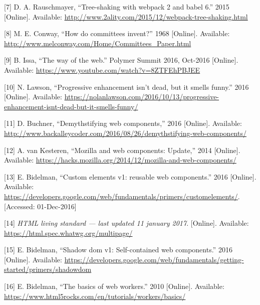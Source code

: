 \documentclass[]{assets/latex/ieee}
\begin{document}
\hypertarget{ref-Rauschmayer2015}{}
{[}7{]} D. A. Rauschmayer, ``Tree-shaking with webpack 2 and babel 6.''
2015 {[}Online{]}. Available:
\url{http://www.2ality.com/2015/12/webpack-tree-shaking.html}

\hypertarget{ref-Conway1968}{}
{[}8{]} M. E. Conway, ``How do committees invent?'' 1968 {[}Online{]}.
Available: \url{http://www.melconway.com/Home/Committees_Paper.html}

\hypertarget{ref-Issa2016}{}
{[}9{]} B. Issa, ``The way of the web.'' Polymer Summit 2016, Oct-2016
{[}Online{]}. Available:
\url{https://www.youtube.com/watch?v=8ZTFEhPBJEE}

\hypertarget{ref-Lawson2016}{}
{[}10{]} N. Lawson, ``Progressive enhancement isn't dead, but it smells
funny.'' 2016 {[}Online{]}. Available:
\url{https://nolanlawson.com/2016/10/13/progressive-enhancement-isnt-dead-but-it-smells-funny/}

\hypertarget{ref-Buchner2016}{}
{[}11{]} D. Buchner, ``Demythstifying web components,'' 2016
{[}Online{]}. Available:
\url{http://www.backalleycoder.com/2016/08/26/demythstifying-web-components/}

\hypertarget{ref-vanKesteren2014}{}
{[}12{]} A. van Kesteren, ``Mozilla and web components: Update,'' 2014
{[}Online{]}. Available:
\url{https://hacks.mozilla.org/2014/12/mozilla-and-web-components/}

\hypertarget{ref-Bidelman2016}{}
{[}13{]} E. Bidelman, ``Custom elements v1: reusable web components.''
2016 {[}Online{]}. Available:
\url{https://developers.google.com/web/fundamentals/primers/customelements/}.
{[}Accessed: 01-Dec-2016{]}

\hypertarget{ref-HTML}{}
{[}14{]} \emph{HTML living standard --- last updated 11 january 2017}.
{[}Online{]}. Available: \url{https://html.spec.whatwg.org/multipage/}

\hypertarget{ref-Bidelman2016shadow}{}
{[}15{]} E. Bidelman, ``Shadow dom v1: Self-contained web components.''
2016 {[}Online{]}. Available:
\url{https://developers.google.com/web/fundamentals/getting-started/primers/shadowdom}

\hypertarget{ref-Bidelman2010}{}
{[}16{]} E. Bidelman, ``The basics of web workers.'' 2010 {[}Online{]}.
Available: \url{https://www.html5rocks.com/en/tutorials/workers/basics/}
\end{document}
